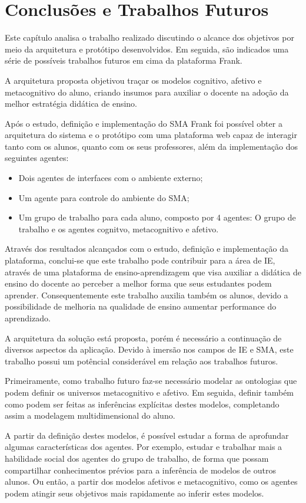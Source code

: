 \chapter{Conclusões e Trabalhos Futuros}
Este capítulo analisa o trabalho realizado discutindo o alcance dos objetivos por meio da arquitetura e protótipo desenvolvidos. Em seguida, são indicados uma série de possíveis trabalhos futuros em cima da plataforma Frank.

A arquitetura proposta objetivou traçar os modelos cognitivo, afetivo e metacognitivo do aluno, criando insumos para auxiliar o docente na adoção da melhor estratégia didática de ensino.

Após o estudo, definição e implementação do SMA Frank foi possível obter a arquitetura do sistema e o protótipo com uma plataforma web capaz de interagir tanto com os alunos, quanto com os seus professores, além da implementação dos seguintes agentes:
\begin{itemize}
 	\item Dois agentes de interfaces com o ambiente externo;
	\item Um agente para controle do ambiente do SMA;
	\item Um grupo de trabalho para cada aluno, composto por 4 agentes: O grupo de trabalho e os agentes cognitvo, metacognitivo e afetivo.
\end{itemize}

Através dos resultados alcançados com o estudo, definição e implementação da plataforma, conclui-se que este trabalho pode contribuir para a área de IE, através de uma plataforma de ensino-aprendizagem que visa auxiliar a didática de ensino do docente ao perceber a melhor forma que seus estudantes podem aprender. Consequentemente este trabalho auxilia também os alunos, devido a possibilidade de melhoria na qualidade de ensino aumentar performance do aprendizado. 

A arquitetura da solução está proposta, porém é necessário a continuação de diversos aspectos da aplicação. Devido à imersão nos campos de IE e SMA, este trabalho possui um potêncial considerável em relação aos trabalhos futuros.

Primeiramente, como trabalho futuro faz-se necessário modelar as ontologias que podem definir os universos metacognitivo e afetivo. Em seguida, definir também como podem ser feitas as inferências explícitas destes modelos, completando assim a modelagem multidimensional do aluno.

A partir da definição destes modelos, é possível estudar a forma de aprofundar algumas características dos agentes. Por exemplo, estudar e trabalhar mais a habilidade social dos agentes do grupo de trabalho, de forma que possam compartilhar conhecimentos prévios para a inferência de modelos de outros alunos. Ou então, a partir dos modelos afetivos e metacognitivo, como os agentes podem atingir seus objetivos mais rapidamente ao inferir estes modelos.

